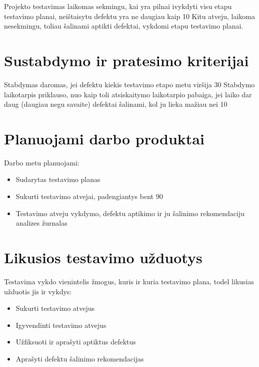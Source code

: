 \documentclass{VUMIFPSkursinis}
\begin{document}
Projekto testavimas laikomas sekmingu, kai yra pilnai ivykdyti visu etapu testavimo planai, neištaisytu defektu yra ne daugiau kaip 10%
Kitu atveju, laikoma nesekmingu, toliau šalinami aptikti defektai, vykdomi etapu testavimo planai.

\section{Sustabdymo ir pratesimo kriterijai}

Stabdymas daromas, jei defektu kiekis testavimo etapo metu viršija 30%
Stabdymo laikotarpis priklauso, nuo kaip toli atsiskaitymo laikotarpio pabaiga, jei laiko dar daug (daugiau negu savaite) defektai šalinami, kol ju lieka mažiau nei 10%

\section{Planuojami darbo produktai}

Darbo metu planuojami: 

\begin{itemize}
	\item Sudarytas testavimo planas
	\item Sukurti testavimo atvejai, padengiantys bent 90%
	\item Testavimo atveju vykdymo, defektu aptikimo ir ju šalinimo rekomendaciju analizes žurnalas
\end{itemize}

\section{Likusios testavimo užduotys}

Testavima vykdo vienintelis žmogus, kuris ir kuria testavimo plana, todel likusias užduotis jis ir vykdys:

\begin{itemize}
	\item Sukurti testavimo atvejus
	\item Igyvendinti testavimo atvejus
	\item Užfiksuoti ir aprašyti aptiktus defektus
	\item Aprašyti defektu šalinimo rekomendacijas
\end{itemize}
\end{document}
